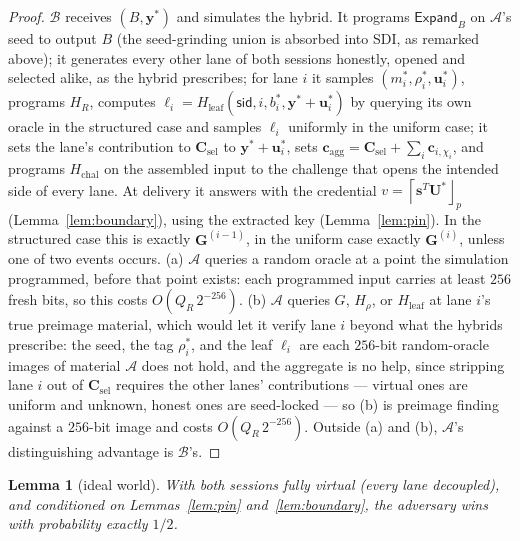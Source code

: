 \documentclass[11pt]{article}
\newcommand{\roundp}[1]{\left\lceil #1\right\rfloor_p}
\newcommand{\Gm}{\mathbf{G}}
\newtheorem{lemma}[theorem]{Lemma}
\begin{document}
\begin{proof}
$\mathcal B$ receives $(B,\mathbf y^*)$ and simulates the hybrid.  It
programs $\mathsf{Expand}_B$ on $\mathcal A$'s seed to output $B$ (the
seed-grinding union is absorbed into SDI, as remarked above); it generates
every other lane of both sessions honestly, opened and selected alike, as
the hybrid prescribes; for lane $i$ it samples
$(m_i^*,\rho_i^*,\mathbf u_i^*)$, programs $H_R$, computes
$\ell_i=H_{\mathrm{leaf}}(\mathsf{sid},i,b_i^*,\mathbf y^*+\mathbf u_i^*)$
by querying its own oracle in the structured case and samples $\ell_i$
uniformly in the uniform case; it sets the lane's contribution to
$\mathbf C_{\mathrm{sel}}$ to $\mathbf y^*+\mathbf u_i^*$, sets
$\mathbf c_{\mathrm{agg}}=\mathbf C_{\mathrm{sel}}+\sum_i\mathbf
c_{i,\chi_i}$, and programs $H_{\mathrm{chal}}$ on the assembled input to
the challenge that opens the intended side of every lane.  At delivery it
answers with the credential $v=\roundp{\mathbf s^{T}\mathbf U^*}$
(Lemma~\ref{lem:boundary}), using the extracted key
(Lemma~\ref{lem:pin}).  In the structured case this is exactly
$\Gm^{(i-1)}$, in the uniform case exactly $\Gm^{(i)}$, unless one of two
events occurs.  (a) $\mathcal A$ queries a random oracle at a point the
simulation programmed, before that point exists: each programmed input
carries at least $256$ fresh bits, so this costs $O(Q_R\,2^{-256})$.
(b) $\mathcal A$ queries $G$, $H_\rho$, or $H_{\mathrm{leaf}}$ at lane
$i$'s true preimage material, which would let it verify lane $i$ beyond
what the hybrids prescribe: the seed, the tag $\rho_i^*$, and the leaf
$\ell_i$ are each $256$-bit random-oracle images of material $\mathcal A$
does not hold, and the aggregate is no help, since stripping lane $i$ out
of $\mathbf C_{\mathrm{sel}}$ requires the other lanes' contributions ---
virtual ones are uniform and unknown, honest ones are seed-locked --- so
(b) is preimage finding against a $256$-bit image and costs
$O(Q_R\,2^{-256})$.  Outside (a) and (b), $\mathcal A$'s distinguishing
advantage is $\mathcal B$'s.
\end{proof}

\begin{lemma}[ideal world]
\label{lem:ideal}
With both sessions fully virtual (every lane decoupled), and conditioned on
Lemmas~\ref{lem:pin} and~\ref{lem:boundary}, the adversary wins with
probability exactly $1/2$.
\end{lemma}
\end{document}
